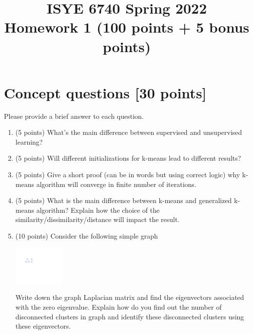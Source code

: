 \documentclass[twoside,10pt]{article}
\begin{document}
\title{ISYE 6740 Spring 2022\\ Homework 1 (100 points + 5 bonus points)}
\date{}

\maketitle

\vspace{-.5in}


\section{Concept questions [30 points]}

Please provide a brief answer to each question.

\begin{enumerate}

\item (5 points) What's the main difference between supervised and unsupervised learning?

\item (5 points) Will different initializations for k-means lead to different results?

\item (5 points) Give a short proof (can be in words but using correct logic) why k-means algorithm will converge in finite number of iterations.

\item (5 points) What is the main difference between k-means and generalized k-means algorithm? Explain how the choice of the similarity/dissimilarity/distance will impact the result. 



\item (10 points) Consider the following simple graph
\begin{center}
\includegraphics[width = 0.2\textwidth]{plot}
\end{center}

Write down the graph Laplacian matrix and find the eigenvectors associated with the zero eigenvalue. Explain how do you find out the number of disconnected clusters in graph and identify these disconnected clusters using these eigenvectors.

\end{enumerate}
\end{document}
